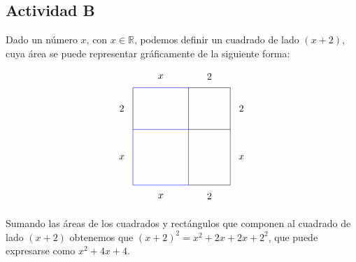 \subsection*{Actividad B}

Dado un número $x$, con $x \in \mathbb{R}$, podemos definir un cuadrado de lado $(x+2)$, cuya área se puede representar gráficamente de la siguiente forma:

\begin{align*}
\begin{tikzpicture}
\draw[blue] (0,0) rectangle (2,2);
\draw (1, -0.4) node{$x$};
\draw (2,2) rectangle (3.5,3.5);
\draw (3.9, 2.75) node{$2$};
\draw (2,0) -- (3.5,0);
\draw (2.75, -0.4) node{$2$};
\draw[blue] (3.5, 0) -- (3.5, 2);
\draw (3.9, 1) node{$x$};
\draw[blue] (0, 3.5) -- (2, 3.5);
\draw (1, 3.9) node{$x$};
\draw (0, 2) -- (0, 3.5);
\draw (-0.4, 2.75) node{$2$};
\draw (2.75, 3.9) node{$2$};
\draw (-0.4, 1) node{$x$};
\end{tikzpicture}
\end{align*}

Sumando las áreas de los cuadrados y rectángulos que componen al cuadrado de lado $(x+2)$ obtenemos que $(x+2)^2 = x^2 + 2x + 2x + 2^2$, que puede expresarse como $x^2 + 4x +4$.
